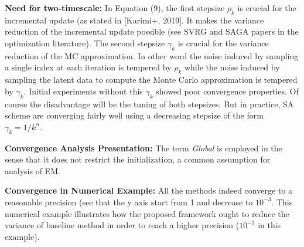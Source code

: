 \documentclass{article}
\begin{document}
\textbf{Need for two-timescale:}
In Equation (9), the first stepsize $\rho_k$ is crucial for the incremental update (as stated in [Karimi+, 2019]. It makes the variance reduction of the incremental update possible (see SVRG and SAGA papers in the optimization literature).
The second stepsize $\gamma_k$ is crucial for the variance reduction of the MC approximation. In other word the noise induced by sampling a single index at each iteration is tempered by $\rho_k$ while the noise induced by sampling the latent data to compute the Monte Carlo approximation is tempered by $\gamma_k$. Initial experiments without this $\gamma_k$ showed poor convergence properties.
Of course the disadvantage will be the tuning of both stepsizes. But in practice, SA scheme are converging fairly well using a decreasing stepsize of the form $\gamma_k = 1/k^{\alpha}$.


\textbf{Convergence Analysis Presentation:}
The term \emph{Global} is employed in the sense that it does not restrict the initialization, a common assumption for analysis of EM.

\textbf{Convergence in Numerical Example:}
All the methods indeed converge to a reasonable precision (see that the y axis start from 1 and decrease to $10^{-3}$.
This numerical example illustrates how the proposed framework ought to reduce the variance of baseline method in order to reach a higher precision ($10^{-3}$ in this example).
\end{document}
